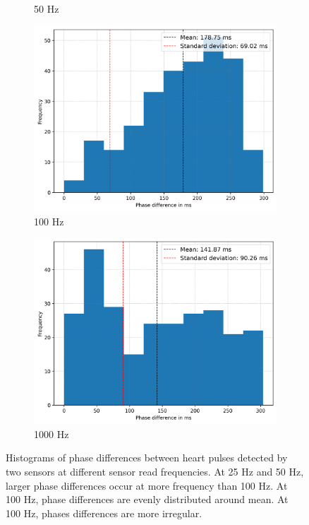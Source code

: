 \begin{figure}[t]
\begin{subfigure}{0.5\linewidth}
        \caption{50 Hz}
        \label{fig:histogram_50}
        \vspace{1\baselineskip}
    \end{subfigure}
    \begin{subfigure}{0.5\linewidth}
        \centering
        \includegraphics[width=\linewidth]{chapters/Results/histogram_100.png}
        \caption{100 Hz}
        \label{fig:histogram_100}
    \end{subfigure}
    \begin{subfigure}{0.5\linewidth}
        \centering
        \includegraphics[width=\linewidth]{chapters/Results/histogram_1000.png}
        \caption{1000 Hz}
        \label{fig:histogram_1000}
    \end{subfigure}
    \caption{Histograms of phase differences between heart pulses detected by two sensors at different sensor read frequencies. At 25 Hz and 50 Hz, larger phase differences occur at more frequency than 100 Hz. At 100 Hz, phase differences are evenly distributed around mean. At 100 Hz, phases differences are more irregular.}
    \label{fig:histograms_sensor_accuracy}
\end{figure}

